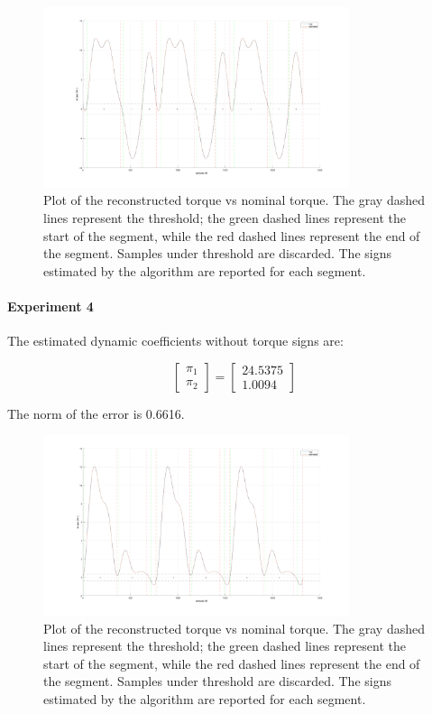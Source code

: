 \documentclass{article}
\begin{document}
\begin{figure}[!htbp]
\centering
\includegraphics[width=0.8\textwidth]{images/1-dof/results_new_experiment5.png}
\caption{Plot of the reconstructed torque vs nominal torque. The gray dashed lines represent the threshold; the green dashed lines represent the start of the segment, while the red dashed lines represent the end of the segment. Samples under threshold are discarded. The signs estimated by the algorithm are reported for each segment.}
\end{figure}
\FloatBarrier

\paragraph{Experiment 4} The estimated dynamic coefficients without torque signs are:

\[\begin{bmatrix}
\pi_1  \\ \pi_2 
\end{bmatrix}=\begin{bmatrix}
24.5375 \\ 1.0094
\end{bmatrix}\]

The norm of the error is 0.6616.

\begin{figure}[!htbp]
\centering
\includegraphics[width=0.8\textwidth]{images/1-dof/results_new_experiment6.png}
\caption{Plot of the reconstructed torque vs nominal torque. The gray dashed lines represent the threshold; the green dashed lines represent the start of the segment, while the red dashed lines represent the end of the segment. Samples under threshold are discarded. The signs estimated by the algorithm are reported for each segment.}
\end{figure}
\FloatBarrier
\end{document}
